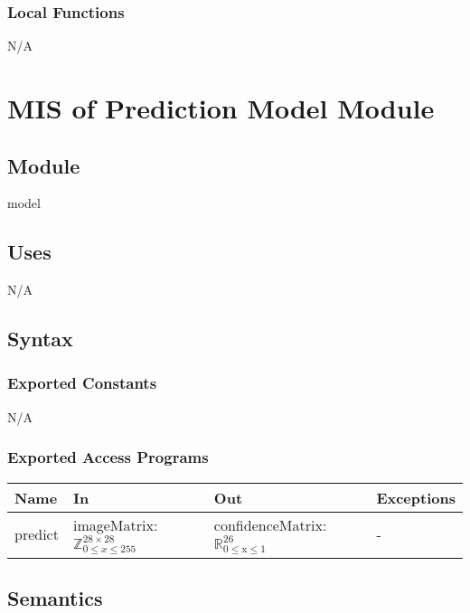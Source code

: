 \documentclass[12pt, titlepage]{article}
\begin{document}
\subsubsection{Local Functions}

N/A


\section{MIS of Prediction Model Module} \label{MModel}

\subsection{Module}

model

\subsection{Uses}

N/A


\subsection{Syntax}

\subsubsection{Exported Constants}

N/A

\subsubsection{Exported Access Programs}

\begin{center}
\begin{tabular}{p{2cm} p{4cm} p{4cm} p{2cm}}
\hline
\textbf{Name} & \textbf{In} & \textbf{Out} & \textbf{Exceptions} \\
\hline
predict & imageMatrix: $\mathbb{Z}^{28 \times 28}_{0 \le x \le 255}$ & confidenceMatrix: $\mathbb{R}_{\text{0} \leq \text{x} \leq \text{1}}^{26}$ & - \\
\hline
\end{tabular}
\end{center}

\subsection{Semantics}
\end{document}
